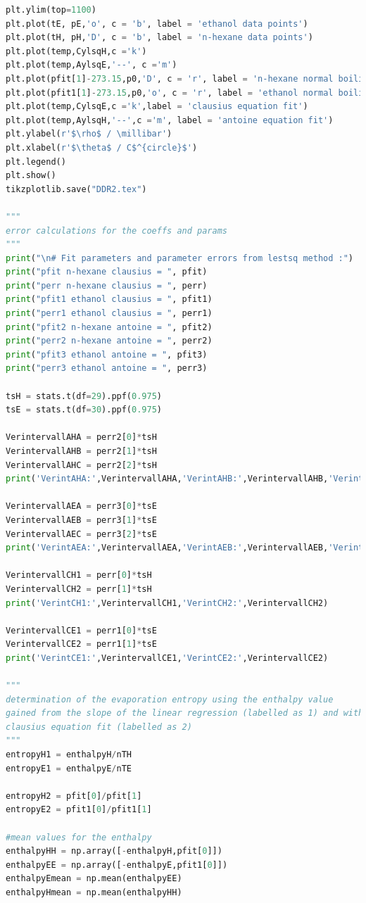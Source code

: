 \documentclass[a4paper,abstracton]{article}	                       %
\begin{document}
\begin{lstlisting}[language=Python]
plt.ylim(top=1100)
plt.plot(tE, pE,'o', c = 'b', label = 'ethanol data points')
plt.plot(tH, pH,'D', c = 'b', label = 'n-hexane data points')
plt.plot(temp,CylsqH,c ='k')
plt.plot(temp,AylsqE,'--', c ='m')
plt.plot(pfit[1]-273.15,p0,'D', c = 'r', label = 'n-hexane normal boiling point')
plt.plot(pfit1[1]-273.15,p0,'o', c = 'r', label = 'ethanol normal boiling point')
plt.plot(temp,CylsqE,c ='k',label = 'clausius equation fit')
plt.plot(temp,AylsqH,'--',c ='m', label = 'antoine equation fit')
plt.ylabel(r'$\rho$ / \millibar')
plt.xlabel(r'$\theta$ / C$^{circle}$')
plt.legend()
plt.show()
tikzplotlib.save("DDR2.tex")

"""
error calculations for the coeffs and params
"""
print("\n# Fit parameters and parameter errors from lestsq method :")
print("pfit n-hexane clausius = ", pfit)
print("perr n-hexane clausius = ", perr)
print("pfit1 ethanol clausius = ", pfit1)
print("perr1 ethanol clausius = ", perr1)
print("pfit2 n-hexane antoine = ", pfit2)
print("perr2 n-hexane antoine = ", perr2)
print("pfit3 ethanol antoine = ", pfit3)
print("perr3 ethanol antoine = ", perr3)

tsH = stats.t(df=29).ppf(0.975)
tsE = stats.t(df=30).ppf(0.975)

VerintervallAHA = perr2[0]*tsH
VerintervallAHB = perr2[1]*tsH
VerintervallAHC = perr2[2]*tsH
print('VerintAHA:',VerintervallAHA,'VerintAHB:',VerintervallAHB,'VerintAHC:',VerintervallAHC)

VerintervallAEA = perr3[0]*tsE
VerintervallAEB = perr3[1]*tsE
VerintervallAEC = perr3[2]*tsE  
print('VerintAEA:',VerintervallAEA,'VerintAEB:',VerintervallAEB,'VerintAEC:',VerintervallAEC)

VerintervallCH1 = perr[0]*tsH
VerintervallCH2 = perr[1]*tsH 
print('VerintCH1:',VerintervallCH1,'VerintCH2:',VerintervallCH2)

VerintervallCE1 = perr1[0]*tsE 
VerintervallCE2 = perr1[1]*tsE 
print('VerintCE1:',VerintervallCE1,'VerintCE2:',VerintervallCE2)

"""
determination of the evaporation entropy using the enthalpy value 
gained from the slope of the linear regression (labelled as 1) and with the ethalpy value from the
clausius equation fit (labelled as 2)
"""
entropyH1 = enthalpyH/nTH
entropyE1 = enthalpyE/nTE

entropyH2 = pfit[0]/pfit[1]
entropyE2 = pfit1[0]/pfit1[1]

#mean values for the enthalpy 
enthalpyHH = np.array([-enthalpyH,pfit[0]])
enthalpyEE = np.array([-enthalpyE,pfit1[0]])
enthalpyEmean = np.mean(enthalpyEE)
enthalpyHmean = np.mean(enthalpyHH)



\end{lstlisting}
\end{document}

